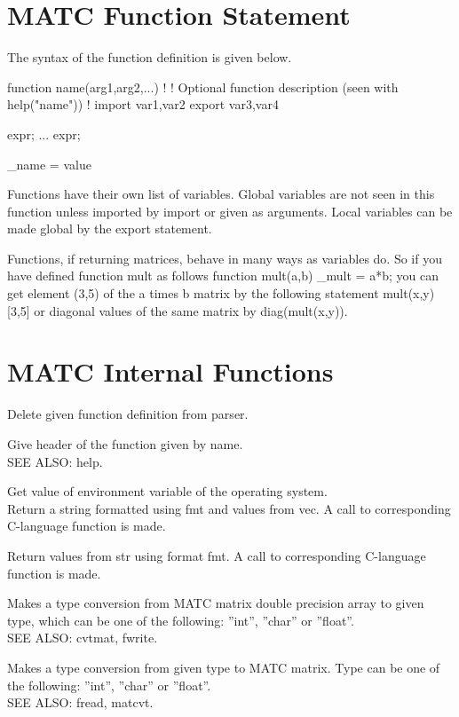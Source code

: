 \section{MATC Function Statement}


The syntax of the function definition is given below. 

\ttbegin
function name(arg1,arg2,...)
!
! Optional function description (seen with help("name"))
!
import var1,var2
export var3,var4
{
    expr;
     ...
    expr;

    \_name = value
}
\ttend

Functions have their own list of variables. Global variables are not seen in this 
function unless imported by import or given as arguments. Local variables can be made global by the export statement. 

Functions, if returning matrices, behave in many ways as variables do. So if you have defined function mult as follows 
\ttbegin
function mult(a,b)
{
   _mult = a*b;
}
\ttend
you can get element (3,5) of the a times b matrix by the following statement 
\ttbegin
mult(x,y)[3,5]
\ttend
or diagonal values of the same matrix by 
\ttbegin
diag(mult(x,y)).
\ttend


\section{MATC Internal Functions}

\sifbegin
{}
Delete given function definition from parser. 

Give header of the function given by name. \\
SEE ALSO: help. 

Get value of environment variable of the operating system. \\

Return a string formatted using fmt and values from vec. A call to corresponding C-language function is made. 

Return values from str using format fmt. A call to corresponding C-language function is made. 

Makes a type conversion from MATC matrix double precision array to given type, 
which can be one of the following: ''int'', ''char'' or ''float''. \\
SEE ALSO: cvtmat, fwrite. 

Makes a type conversion from given type to MATC matrix. Type can be one of the following: ''int'', ''char'' or ''float''. \\
SEE ALSO: fread, matcvt. 

